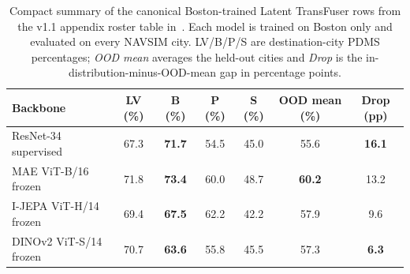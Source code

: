 \begin{table}[ht]
\centering
\caption[Boston-only v1.1 Latent TransFuser cross-city summary.]{%
Compact summary of the canonical Boston-trained Latent TransFuser rows from the v1.1 appendix roster table in~. Each model is trained on Boston only and evaluated on every NAVSIM city. LV/B/P/S are destination-city PDMS percentages; \emph{OOD mean} averages the held-out cities and \emph{Drop} is the in-distribution-minus-OOD-mean gap in percentage points.}
\label{tab:navsim_pdms_boston_v11}
\vspace{0.35em}
\small
\renewcommand{\arraystretch}{1.15}
\setlength{\tabcolsep}{5pt}
\begin{tabular}{@{}>{\raggedright\arraybackslash}p{3.6cm} c c c c c c@{}}
\toprule
\textbf{Backbone} & \textbf{LV (\%)} & \textbf{B (\%)} & \textbf{P (\%)} & \textbf{S (\%)} & \textbf{OOD mean (\%)} & \textbf{Drop (pp)} \\
\midrule
\rowcolor{gray!12}
ResNet-34 supervised & 67.3 & \textbf{71.7} & 54.5 & 45.0 & 55.6 & \textbf{16.1} \\
MAE ViT-B/16 frozen  & 71.8 & \textbf{73.4} & 60.0 & 48.7 & \textbf{60.2} & 13.2 \\
I-JEPA ViT-H/14 frozen & 69.4 & \textbf{67.5} & 62.2 & 42.2 & 57.9 & 9.6 \\
DINOv2 ViT-S/14 frozen & 70.7 & \textbf{63.6} & 55.8 & 45.5 & 57.3 & \textbf{6.3} \\
\bottomrule
\end{tabular}
\end{table}
